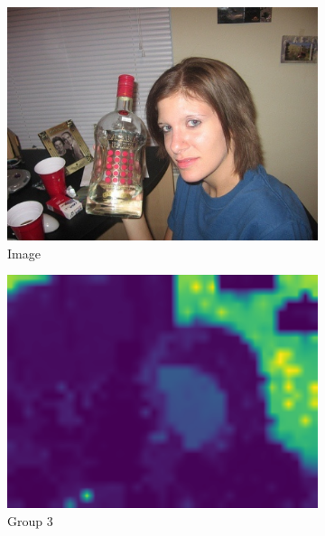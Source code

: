 \begin{figure}[t]
\centering


\begin{subfigure}{0.19\textwidth}
    \centering
    \includegraphics[width=\linewidth]{Images/0009.jpg}
    \caption{Image}
\end{subfigure}
\hfill
\begin{subfigure}{0.19\textwidth}
    \centering
    \includegraphics[width=\linewidth]{Images/all group tokens/10/attn_map2withouttitle.pdf}
    \caption{Group 3}
\end{subfigure}
\hfill
\begin{subfigure}{0.19\textwidth}
    \centering

\end{subfigure}
\end{figure}
